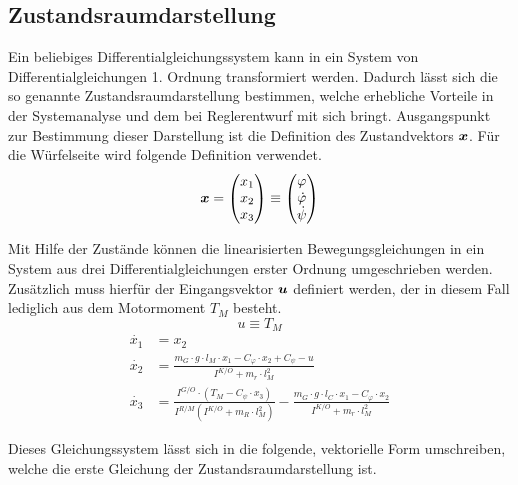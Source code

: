 \subsection{Zustandsraumdarstellung}
Ein beliebiges Differentialgleichungssystem kann in ein System von Differentialgleichungen 1. Ordnung transformiert werden. Dadurch lässt sich die so genannte Zustandsraumdarstellung bestimmen, welche erhebliche Vorteile in der Systemanalyse und dem bei Reglerentwurf mit sich bringt. Ausgangspunkt zur Bestimmung dieser Darstellung ist die Definition des Zustandvektors $\boldsymbol{x}$. Für die Würfelseite wird folgende Definition verwendet.
\begin{equation}
\boldsymbol{x} = \begin{pmatrix}
x_1 \\ x_2 \\ x_3
\end{pmatrix} \equiv \begin{pmatrix}
\varphi \\ \dot{\varphi} \\ \dot{\psi}
\end{pmatrix}
\end{equation}

Mit Hilfe der Zustände können die linearisierten Bewegungsgleichungen in ein System aus drei Differentialgleichungen erster Ordnung umgeschrieben werden. Zusätzlich muss hierfür der Eingangsvektor $\boldsymbol{u}$ definiert werden, der in diesem Fall lediglich aus dem Motormoment $T_M$ besteht.
\begin{equation}
u \equiv T_M
\end{equation}
\begin{equation}
\begin{split}
\dot{x_1} &= x_2 \\
\dot{x_2} &= \frac{m_G \cdot g \cdot l_M \cdot x_1 - C_{\varphi}\cdot x_2 + C_{\psi} - u }{I^{K/O}+m_r\cdot l^2_{M}} \\
\dot{x_3} &= \frac{I^{G/O}\cdot(T_M - C_{\psi}\cdot x_3)}{I^{R/M}(I^{K/O}+m_R\cdot l^2_{M})}-\frac{m_G\cdot g \cdot l_C \cdot x_1 - C_{\varphi}\cdot x_2}{I^{K/O}+m_r \cdot l^2_M}
\end{split}
\end{equation}

Dieses Gleichungssystem lässt sich in die folgende, vektorielle Form umschreiben, welche die erste Gleichung der Zustandsraumdarstellung ist.

